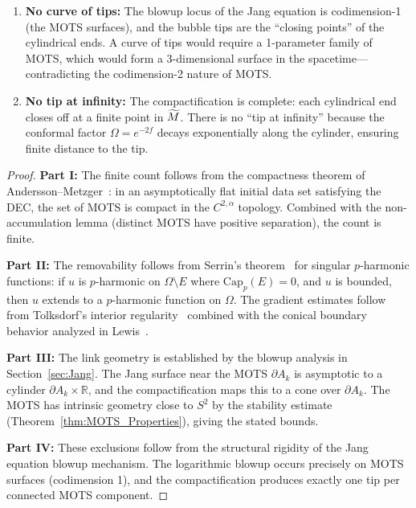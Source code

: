 \begin{proposition}
\begin{enumerate}
    \item \textbf{No curve of tips:} The blowup locus of the Jang equation is codimension-1 (the MOTS surfaces), and the bubble tips are the ``closing points'' of the cylindrical ends. A curve of tips would require a 1-parameter family of MOTS, which would form a 3-dimensional surface in the spacetime---contradicting the codimension-2 nature of MOTS.
    
    \item \textbf{No tip at infinity:} The compactification is complete: each cylindrical end closes off at a finite point in $\widetilde{M}$. There is no ``tip at infinity'' because the conformal factor $\Omega = e^{-2f}$ decays exponentially along the cylinder, ensuring finite distance to the tip.
\end{enumerate}
\end{proposition}
\begin{proof}
\textbf{Part I:} The finite count follows from the compactness theorem of Andersson--Metzger~\cite{anderssonmetzger2009}: in an asymptotically flat initial data set satisfying the DEC, the set of MOTS is compact in the $C^{2,\alpha}$ topology. Combined with the non-accumulation lemma (distinct MOTS have positive separation), the count is finite.

\textbf{Part II:} The removability follows from Serrin's theorem~\cite{serrin1964} for singular $p$-harmonic functions: if $u$ is $p$-harmonic on $\Omega \setminus E$ where $\text{Cap}_p(E) = 0$, and $u$ is bounded, then $u$ extends to a $p$-harmonic function on $\Omega$. The gradient estimates follow from Tolksdorf's interior regularity~\cite{tolksdorf1984} combined with the conical boundary behavior analyzed in Lewis~\cite{lewis1983}.

\textbf{Part III:} The link geometry is established by the blowup analysis in Section~\ref{sec:Jang}. The Jang surface near the MOTS $\partial A_k$ is asymptotic to a cylinder $\partial A_k \times \mathbb{R}$, and the compactification maps this to a cone over $\partial A_k$. The MOTS has intrinsic geometry close to $S^2$ by the stability estimate (Theorem~\ref{thm:MOTS_Properties}), giving the stated bounds.

\textbf{Part IV:} These exclusions follow from the structural rigidity of the Jang equation blowup mechanism. The logarithmic blowup occurs precisely on MOTS surfaces (codimension 1), and the compactification produces exactly one tip per connected MOTS component.
\end{proof}

